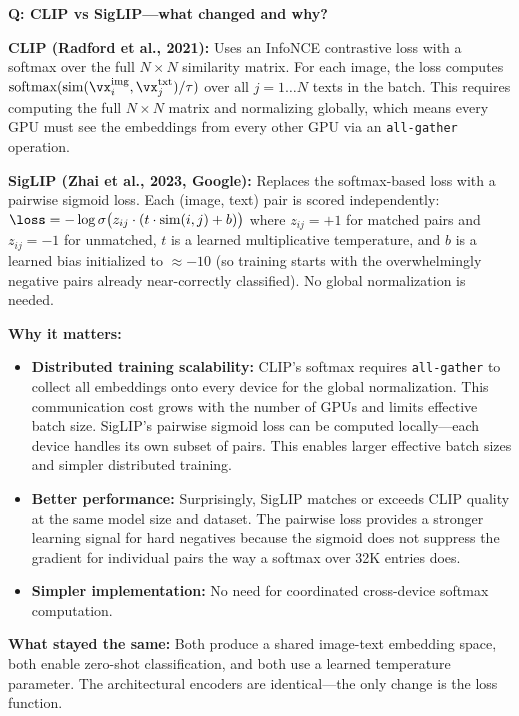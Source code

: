 \begin{interviewq}
\textbf{Q: CLIP vs SigLIP---what changed and why?}

 \quad {} \quad \badgefreq{\freqmed}

\stronganswer

\textbf{CLIP (Radford et al., 2021):} Uses an InfoNCE contrastive loss with a softmax over the full $N \times N$ similarity matrix. For each image, the loss computes $\text{softmax}(\text{sim}(\vx_i^{\text{img}}, \vx_j^{\text{txt}}) / \tau)$ over all $j = 1 \ldots N$ texts in the batch. This requires computing the full $N \times N$ matrix and normalizing globally, which means every GPU must see the embeddings from every other GPU via an \texttt{all-gather} operation.

\textbf{SigLIP (Zhai et al., 2023, Google):} Replaces the softmax-based loss with a pairwise sigmoid loss. Each (image, text) pair is scored independently: $\loss = -\log\sigma\big(z_{ij} \cdot (t \cdot \text{sim}(i,j) + b)\big)$ where $z_{ij} = +1$ for matched pairs and $z_{ij} = -1$ for unmatched, $t$ is a learned multiplicative temperature, and $b$ is a learned bias initialized to $\approx -10$ (so training starts with the overwhelmingly negative pairs already near-correctly classified). No global normalization is needed.

\textbf{Why it matters:}
\begin{itemize}
    \item \textbf{Distributed training scalability:} CLIP's softmax requires \texttt{all-gather} to collect all embeddings onto every device for the global normalization. This communication cost grows with the number of GPUs and limits effective batch size. SigLIP's pairwise sigmoid loss can be computed locally---each device handles its own subset of pairs. This enables larger effective batch sizes and simpler distributed training.
    \item \textbf{Better performance:} Surprisingly, SigLIP matches or exceeds CLIP quality at the same model size and dataset. The pairwise loss provides a stronger learning signal for hard negatives because the sigmoid does not suppress the gradient for individual pairs the way a softmax over 32K entries does.
    \item \textbf{Simpler implementation:} No need for coordinated cross-device softmax computation.
\end{itemize}

\textbf{What stayed the same:} Both produce a shared image-text embedding space, both enable zero-shot classification, and both use a learned temperature parameter. The architectural encoders are identical---the only change is the loss function.


\end{interviewq}
